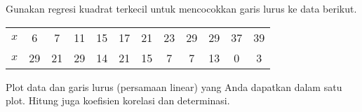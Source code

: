 \begin{soal}
Gunakan regresi kuadrat terkecil untuk mencocokkan garis lurus
ke data berikut.

{\centering
\begin{tabular}{|c|ccccccccccc|}
\hline
$x$ & 6 & 7 & 11 & 15 & 17 & 21 & 23 & 29 & 29 & 37 & 39 \\
$x$ & 29 & 21 & 29 & 14 & 21 & 15 & 7 & 7 & 13 & 0 & 3 \\
\hline
\end{tabular}
\par}

Plot data dan garis lurus (persamaan linear) yang Anda dapatkan
dalam satu plot. Hitung juga koefisien korelasi dan determinasi.
\end{soal}


